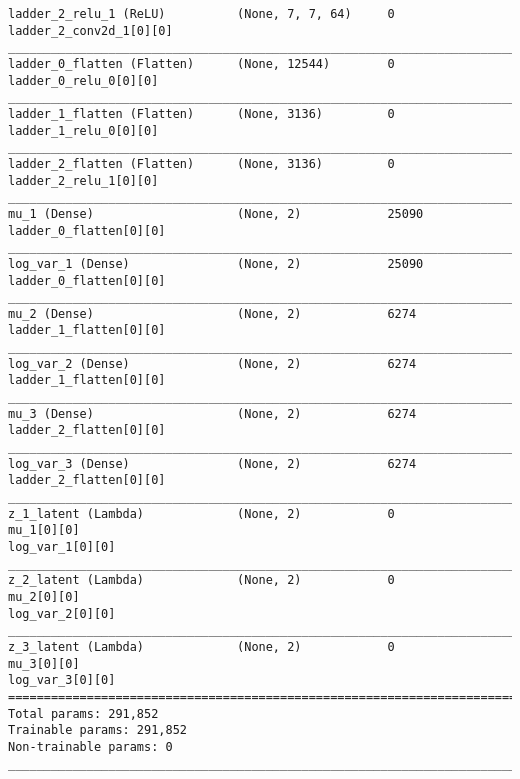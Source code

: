 \begin{lstlisting}[caption={\textsc{Mnist}-VLAE-factor-1 Encoder},captionpos=b,basicstyle=\tiny, label={lst:sparsity-vlae-encoder-28-fm1}]
ladder_2_relu_1 (ReLU)          (None, 7, 7, 64)     0           ladder_2_conv2d_1[0][0]
__________________________________________________________________________________________________
ladder_0_flatten (Flatten)      (None, 12544)        0           ladder_0_relu_0[0][0]
__________________________________________________________________________________________________
ladder_1_flatten (Flatten)      (None, 3136)         0           ladder_1_relu_0[0][0]
__________________________________________________________________________________________________
ladder_2_flatten (Flatten)      (None, 3136)         0           ladder_2_relu_1[0][0]
__________________________________________________________________________________________________
mu_1 (Dense)                    (None, 2)            25090       ladder_0_flatten[0][0]
__________________________________________________________________________________________________
log_var_1 (Dense)               (None, 2)            25090       ladder_0_flatten[0][0]
__________________________________________________________________________________________________
mu_2 (Dense)                    (None, 2)            6274        ladder_1_flatten[0][0]
__________________________________________________________________________________________________
log_var_2 (Dense)               (None, 2)            6274        ladder_1_flatten[0][0]
__________________________________________________________________________________________________
mu_3 (Dense)                    (None, 2)            6274        ladder_2_flatten[0][0]
__________________________________________________________________________________________________
log_var_3 (Dense)               (None, 2)            6274        ladder_2_flatten[0][0]
__________________________________________________________________________________________________
z_1_latent (Lambda)             (None, 2)            0           mu_1[0][0]
log_var_1[0][0]
__________________________________________________________________________________________________
z_2_latent (Lambda)             (None, 2)            0           mu_2[0][0]
log_var_2[0][0]
__________________________________________________________________________________________________
z_3_latent (Lambda)             (None, 2)            0           mu_3[0][0]
log_var_3[0][0]
==================================================================================================
Total params: 291,852
Trainable params: 291,852
Non-trainable params: 0
__________________________________________________________________________________________________
\end{lstlisting}